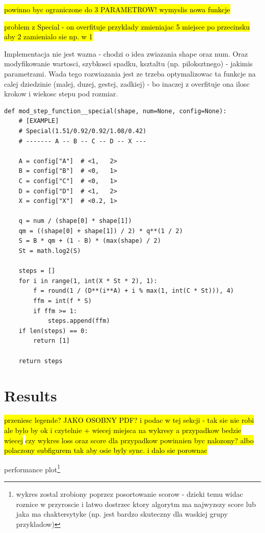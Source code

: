 \documentclass[format=acmsmall,screen,review,authordraft,nonacm]{acmart}
\begin{document}
\hl{powinno byc ograniczone do 3 PARAMETROW! wymyslis nowa funkcje}

\hl{problem z Special - on overfituje przyklady zmieniajac 5 miejsce po
przecinsku aby 2 zamienialo sie np. w 1}

Implementacja nie jest wazna - chodzi o idea zwiazania shape oraz num. Oraz
modyfikowanie wartosci, szybkosci spadku, ksztaltu (np. piloksztnego) - jakimis
parametrami. Wada tego rozwiazania jest ze trzeba optymalizowac ta funkcje na
calej dziedzinie (malej, duzej, gestej, zadkiej) - bo inaczej z overfituje ona
ilosc krokow i wiekosc stepu pod rozmiar.

\begin{lstlisting}
def mod_step_function__special(shape, num=None, config=None):
    # [EXAMPLE]
    # Special(1.51/0.92/0.92/1.08/0.42)
    # ------- A -- B -- C -- D -- X --- 

    A = config["A"]  # <1,   2>
    B = config["B"]  # <0,   1>
    C = config["C"]  # <0,   1>
    D = config["D"]  # <1,   2>
    X = config["X"]  # <0.2, 1>

    q = num / (shape[0] * shape[1])
    qm = ((shape[0] + shape[1]) / 2) * q**(1 / 2)
    S = B * qm + (1 - B) * (max(shape) / 2)
    St = math.log2(S)

    steps = []
    for i in range(1, int(X * St * 2), 1):
        f = round(1 / (D**(i**A) + i % max(1, int(C * St))), 4)
        ffm = int(f * S)
        if ffm >= 1:
            steps.append(ffm)
    if len(steps) == 0:
        return [1]

    return steps
\end{lstlisting}

\section{Results} %
\pagecolor{yellow}

\hl {przeniesc legende? JAKO OSOBNY PDF? i podac w tej sekcji - tak sie nie robi
ale bylo by ok i czytelnie + wiecej miejsca na wykresy a przypadkow bedzie
wiecej}
\hl{czy wykres loss oraz score dla przypadkow powinnien byc nalozony? albo
polaczony subfigurem tak aby osie byly sync. i dalo sie porownac}

performance plot\footnote{wykres zostal zrobiony poprzez posortowanie scorow - dzieki temu widac roznice w
przyroscie i latwo dostrzec ktory algorytm ma najwyzszy score lub jaka ma
chaktersytyke (np. jest bardzo skuteczny dla waskiej grupy przykladow)
}
\end{document}
